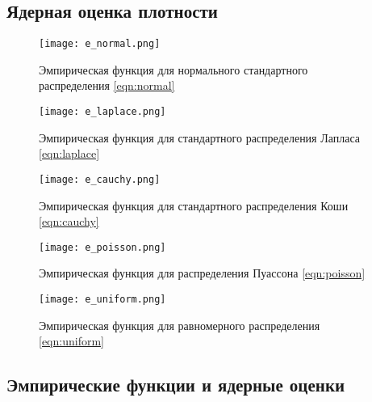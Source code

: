 \documentclass[a4]{article}
\begin{document}
\begin{center}
\begin{table}[H]
\begin{center}
    \end{center}
    
\end{table}

\end{center}








\subsection{Ядерная оценка плотности}
\begin{center}

\begin{figure}[H]
\caption{Эмпирическая функция для нормального стандартного распределения \eqref{eqn:normal}}
\texttt{[image: e\_normal.png]}
\end{figure}

\begin{figure}[H]
\caption{Эмпирическая функция для стандартного распределения Лапласа \eqref{eqn:laplace}}
\texttt{[image: e\_laplace.png]} 
\end{figure}

\begin{figure}[H]
\caption{Эмпирическая функция для стандартного распределения Коши \eqref{eqn:cauchy}}
\texttt{[image: e\_cauchy.png]} 
\end{figure}

\begin{figure}[H]
\caption{Эмпирическая функция для распределения Пуассона \eqref{eqn:poisson}}
\texttt{[image: e\_poisson.png]} 
\end{figure}

\begin{figure}[H]
 \caption{Эмпирическая функция для равномерного распределения \eqref{eqn:uniform}}
\texttt{[image: e\_uniform.png]}
\end{figure}
\end{center}
\subsection{Эмпирические функции и ядерные оценки}
\end{document}
